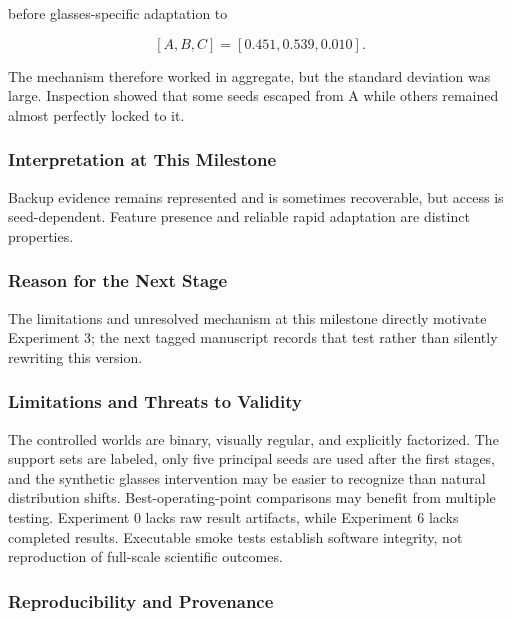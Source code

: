 \documentclass[
  10pt,
]{article}
\begin{document}
before glasses-specific adaptation to

\[
[A,B,C]=[0.451,0.539,0.010].
\]

The mechanism therefore worked in aggregate, but the standard deviation
was large. Inspection showed that some seeds escaped from A while others
remained almost perfectly locked to it.

\hypertarget{interpretation-at-this-milestone}{%
\subsubsection{Interpretation at This
Milestone}\label{interpretation-at-this-milestone}}

Backup evidence remains represented and is sometimes recoverable, but
access is seed-dependent. Feature presence and reliable rapid adaptation
are distinct properties.

\hypertarget{reason-for-the-next-stage}{%
\subsubsection{Reason for the Next
Stage}\label{reason-for-the-next-stage}}

The limitations and unresolved mechanism at this milestone directly
motivate Experiment 3; the next tagged manuscript records that test
rather than silently rewriting this version.

\hypertarget{limitations-and-threats-to-validity}{%
\subsubsection{Limitations and Threats to
Validity}\label{limitations-and-threats-to-validity}}

The controlled worlds are binary, visually regular, and explicitly
factorized. The support sets are labeled, only five principal seeds are
used after the first stages, and the synthetic glasses intervention may
be easier to recognize than natural distribution shifts.
Best-operating-point comparisons may benefit from multiple testing.
Experiment 0 lacks raw result artifacts, while Experiment 6 lacks
completed results. Executable smoke tests establish software integrity,
not reproduction of full-scale scientific outcomes.

\hypertarget{reproducibility-and-provenance}{%
\subsubsection{Reproducibility and
Provenance}\label{reproducibility-and-provenance}}
\end{document}
